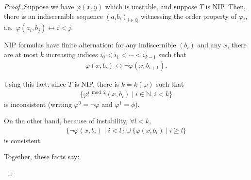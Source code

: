 \documentclass{article}
\begin{document}
\begin{proof}
  Suppose we have $\varphi(x,y)$ which is unstable, and suppose $T$ is NIP.
  Then, there is an indiscernible sequence $(a_i b_i)_{i \in \mathbb{Q}}$ witnessing the order property of $\varphi_i$, i.e.\ $\varphi(a_i, b_j) \leftrightarrow i < j$.

  \begin{fact}
    NIP formulas have finite alternation: for any indiscernible $(b_i)$ and any $x$, there are at most $k$ increasing indices $i_0 < i_1 < \dotsb < i_{k-1}$ such that
    \begin{align*}
      \varphi(x, b_i) \leftrightarrow \neg \varphi(x,b_{i+1}).
    \end{align*}
  \end{fact}

  Using this fact: since $T$ is NIP, there is $k = k(\varphi)$ such that
  \begin{align*}
    \{\varphi^{i \bmod{2}}(x,b_i) \mid i \in \mathbb{N}, i < k\}
  \end{align*}
  is inconsistent
  (writing $\varphi^0 = \neg \varphi$ and $\varphi^1 = \phi$).

  On the other hand, because of instability, $\forall l < k$,
  \begin{align*}
    \{\neg \varphi(x,b_i) \mid i < l\} \cup \{\varphi(x,b_i) \mid i \geq l\}
  \end{align*}
  is consistent.

  Together, these facts say:
  \begin{center}
\end{center}
\end{proof}
\end{document}
